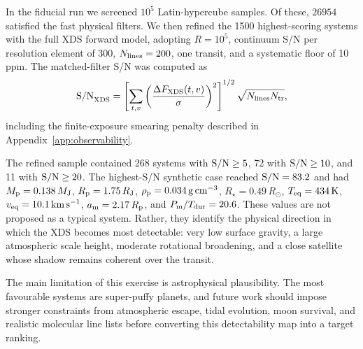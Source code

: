 In the fiducial run we screened $10^5$ Latin-hypercube samples.  Of these,
$26954$ satisfied the fast physical filters.  We then refined the 1500
highest-scoring systems with the full XDS forward model, adopting
$R=10^5$, continuum S/N per resolution element of 300, $N_{\rm lines}=200$,
one transit, and a systematic floor of 10 ppm.  The matched-filter S/N was
computed as
\begin{equation}
{\rm S/N}_{\rm XDS} =
\left[\sum_{t,v}\left(\frac{\Delta F_{\rm XDS}(t,v)}{\sigma}\right)^2
\right]^{1/2}
\sqrt{N_{\rm lines}N_{\rm tr}},
\end{equation}
including the finite-exposure smearing penalty described in
Appendix~\ref{app:observability}.

The refined sample contained 268 systems with ${\rm S/N}\ge5$, 72 with
${\rm S/N}\ge10$, and 11 with ${\rm S/N}\ge20$.  The highest-S/N synthetic
case reached ${\rm S/N}=83.2$ and had
$M_{\rm p}=0.138\,M_{\rm J}$,
$R_{\rm p}=1.75\,R_{\rm J}$,
$\rho_{\rm p}=0.034\,{\rm g\,cm^{-3}}$,
$R_\star=0.49\,R_\odot$,
$T_{\rm eq}=434\,{\rm K}$,
$v_{\rm eq}=10.1\,{\rm km\,s^{-1}}$,
$a_{\rm m}=2.17\,R_{\rm p}$, and
$P_{\rm m}/T_{\rm dur}=20.6$.  These values are not proposed as a typical
system.  Rather, they identify the physical direction in which the XDS becomes
most detectable: very low surface gravity, a large atmospheric scale height,
moderate rotational broadening, and a close satellite whose shadow remains
coherent over the transit.

The main limitation of this exercise is astrophysical plausibility.  The most
favourable systems are super-puffy planets, and future work should impose
stronger constraints from atmospheric escape, tidal evolution, moon survival,
and realistic molecular line lists before converting this detectability map
into a target ranking.

